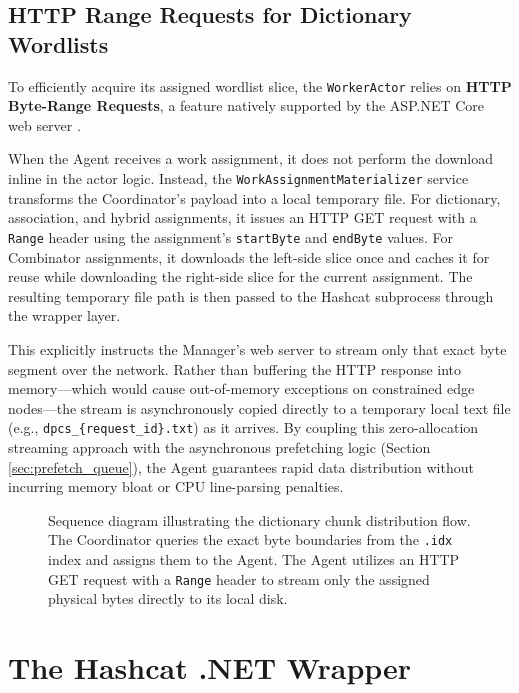 \subsection{HTTP Range Requests for Dictionary Wordlists}
\label{sec:http_range_requests}
To efficiently acquire its assigned wordlist slice, the \verb|WorkerActor| relies on \textbf{HTTP Byte-Range Requests}, a feature natively supported by the ASP.NET Core web server \cite{aspnet_byte_range}.

When the Agent receives a work assignment, it does not perform the download inline in the actor logic. Instead, the \verb|WorkAssignmentMaterializer| service transforms the Coordinator's payload into a local temporary file. For dictionary, association, and hybrid assignments, it issues an HTTP GET request with a \verb|Range| header using the assignment's \verb|startByte| and \verb|endByte| values. For Combinator assignments, it downloads the left-side slice once and caches it for reuse while downloading the right-side slice for the current assignment. The resulting temporary file path is then passed to the Hashcat subprocess through the wrapper layer.

This explicitly instructs the Manager's web server to stream only that exact byte segment over the network. Rather than buffering the HTTP response into memory—which would cause out-of-memory exceptions on constrained edge nodes—the stream is asynchronously copied directly to a temporary local text file (e.g., \verb|dpcs_{request_id}.txt|) as it arrives. By coupling this zero-allocation streaming approach with the asynchronous prefetching logic (Section \ref{sec:prefetch_queue}), the Agent guarantees rapid data distribution without incurring memory bloat or CPU line-parsing penalties.

\begin{figure}[H]
\centering

\caption{Sequence diagram illustrating the dictionary chunk distribution flow. The Coordinator queries the exact byte boundaries from the \texttt{.idx} index and assigns them to the Agent. The Agent utilizes an HTTP GET request with a \texttt{Range} header to stream only the assigned physical bytes directly to its local disk.}
\label{fig:http_range_flow}
\end{figure}

\section{The Hashcat .NET Wrapper}
\label{sec:hashcat_wrapper}

